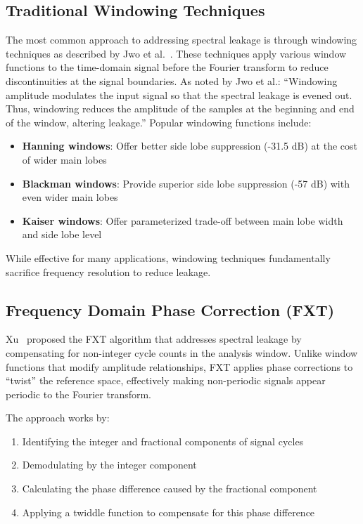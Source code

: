 \documentclass[11pt,twoside]{report}
\numberwithin{thm}{section}
\numberwithin{equation}{section}
\begin{document}
\subsection{Traditional Windowing Techniques}

The most common approach to addressing spectral leakage is through windowing techniques as described by Jwo et al.~\cite{jwo2019windowing}. These techniques apply various window functions to the time-domain signal before the Fourier transform to reduce discontinuities at the signal boundaries. As noted by Jwo et al.: ``Windowing amplitude modulates the input signal so that the spectral leakage is evened out. Thus, windowing reduces the amplitude of the samples at the beginning and end of the window, altering leakage.'' Popular windowing functions include:

\begin{itemize}
    \item \textbf{Hanning windows}: Offer better side lobe suppression (-31.5 dB) at the cost of wider main lobes
    \item \textbf{Blackman windows}: Provide superior side lobe suppression (-57 dB) with even wider main lobes
    \item \textbf{Kaiser windows}: Offer parameterized trade-off between main lobe width and side lobe level
\end{itemize}

While effective for many applications, windowing techniques fundamentally sacrifice frequency resolution to reduce leakage. 

\subsection{Frequency Domain Phase Correction (FXT)}

Xu~\cite{xu2006algorithm} proposed the FXT algorithm that addresses spectral leakage by compensating for non-integer cycle counts in the analysis window. Unlike window functions that modify amplitude relationships, FXT applies phase corrections to ``twist'' the reference space, effectively making non-periodic signals appear periodic to the Fourier transform.

The approach works by:
\begin{enumerate}
    \item Identifying the integer and fractional components of signal cycles
    \item Demodulating by the integer component
    \item Calculating the phase difference caused by the fractional component
    \item Applying a twiddle function to compensate for this phase difference
\end{enumerate}
\end{document}
